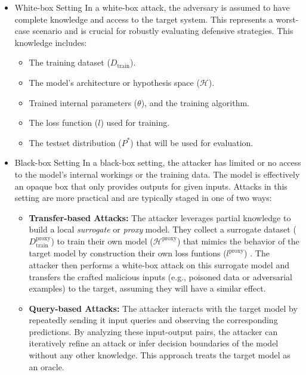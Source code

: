\documentclass[11pt]{report}
\begin{document}
    \begin{itemize}
        \item {White-box Setting}
        In a white-box attack, the adversary is assumed to have complete knowledge and access to the target system. This represents a worst-case scenario and is crucial for robustly evaluating defensive strategies. This knowledge includes:
        \begin{itemize}
            \item The training dataset ($D_{\text{train}}$).
            \item The model's architecture or hypothesis space ($\mathcal{H}$).
            \item Trained internal parameters ($\theta$), and the training algorithm.
            \item The loss function ($l$) used for training.
            \item The testset distribution (${P}^*$) that will be used for evaluation.
        \end{itemize}

        \item{Black-box Setting}
        In a black-box setting, the attacker has limited or no access to the model's internal workings or the training data. The model is effectively an opaque box that only provides outputs for given inputs. Attacks in this setting are more practical and are typically staged in one of two ways:
        
        \begin{itemize}
            \item \textbf{Transfer-based Attacks:} The attacker leverages partial knowledge to build a local \emph{surrogate} or \emph{proxy} model. They collect a surrogate dataset ($D_{\text{train}}^{\text{proxy}}$) to train their own model ($\mathcal{H}^{\text{proxy}}$) that mimics the behavior of the target model by construction their own loss funtions ($l^{\text{proxy}}$) . The attacker then performs a white-box attack on this surrogate model and transfers the crafted malicious inputs (e.g., poisoned data or adversarial examples) to the target, assuming they will have a similar effect.
        
            \item \textbf{Query-based Attacks:} The attacker interacts with the target model by repeatedly sending it input queries and observing the corresponding predictions. By analyzing these input-output pairs, the attacker can iteratively refine an attack or infer decision boundaries of the model without any other knowledge. This approach treats the target model as an oracle.
        \end{itemize}
    \end{itemize}
\end{document}
